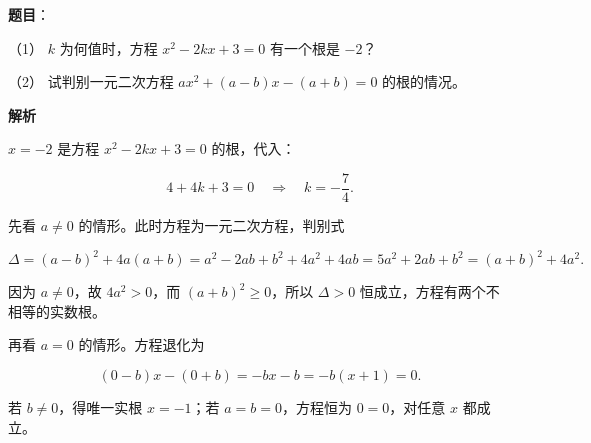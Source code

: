 \begin{answer}

\textbf{题目}：

（1） $k$ 为何值时，方程 $x^2-2kx+3=0$ 有一个根是 $-2$？

（2） 试判别一元二次方程 $ax^2+(a-b)x-(a+b)=0$ 的根的情况。

\textbf{解析}


$x=-2$ 是方程 $x^2-2kx+3=0$ 的根，代入：

\nopagebreak[4]
\[
4+4k+3=0\quad\Longrightarrow\quad k=-\frac74.
\]


先看 $a\ne0$ 的情形。此时方程为一元二次方程，判别式

\nopagebreak[4]
\[
\Delta=(a-b)^2+4a(a+b)=a^2-2ab+b^2+4a^2+4ab=5a^2+2ab+b^2=(a+b)^2+4a^2.
\]

因为 $a\ne0$，故 $4a^2>0$，而 $(a+b)^2\ge0$，所以 $\Delta>0$ 恒成立，方程有两个不相等的实数根。

再看 $a=0$ 的情形。方程退化为

\nopagebreak[4]
\[
(0-b)x-(0+b)=-bx-b=-b(x+1)=0.
\]

若 $b\ne0$，得唯一实根 $x=-1$；若 $a=b=0$，方程恒为 $0=0$，对任意 $x$ 都成立。



\end{answer}
